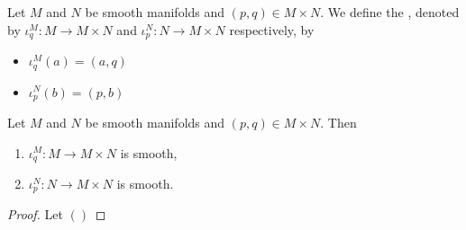 \documentclass{book}
\begin{document}
\begin{defn} 
	Let $M$ and $N$ be smooth manifolds and $(p,q) \in M \times N$. We define the , denoted by $\iota^M_q: M \rightarrow M \times N$ and $\iota^N_p: N \rightarrow M \times N$ respectively, by 
	\begin{itemize}
		\item $\iota^M_q(a) = (a, q)$ 
		\item $\iota^N_p(b) = (p, b)$ 
	\end{itemize}
\end{defn}

\begin{ex} 
	Let $M$ and $N$ be smooth manifolds and $(p,q) \in M \times N$. Then
	\begin{enumerate}
		\item $\iota^M_q: M \rightarrow M \times N$ is smooth,
		\item $\iota^N_p: N \rightarrow M \times N$ is smooth.
	\end{enumerate}
\end{ex}

\begin{proof}
	Let $()$
\end{proof}
\end{document}
